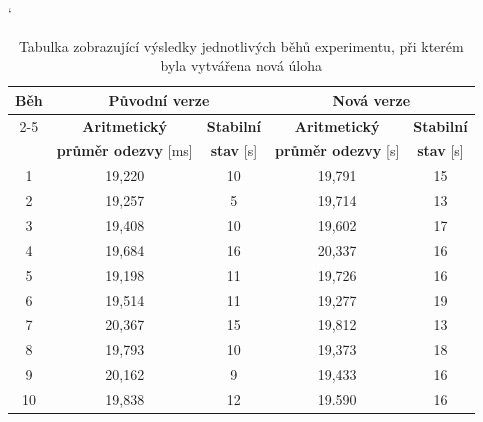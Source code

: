             \begin{table}[ht]
             \catcode`
             \begin{adjustwidth}{-0.5cm}{}
             \begin{center}
              \begin{tabular}{| c || c | c || c | c |} \hline
                \multirow{4}{*}{Běh}  &   \multicolumn{2}{c||}{\textbf{Původní verze}}  &  \multicolumn{2}{c|}{\textbf{Nová verze}}\\ \cline{2-5}
                 & \textbf{Aritmetický} &  \textbf{Stabilní} &  \textbf{Aritmetický}  &  \textbf{Stabilní}\\  
                 & \textbf{průměr odezvy} [ms]  &   \textbf{stav} [s]  &  \textbf{průměr odezvy} [s] &  \textbf{stav} [s]\\\hline
                1 & 19,220 & 10 &  19,791 & 15\\\hline
                2  & 19,257 & 5 & 19,714 & 13\\\hline
                3 & 19,408 & 10 & 19,602 & 17\\\hline
                4 & 19,684  & 16 & 20,337 & 16\\\hline
                5 & 19,198 & 11 & 19,726 & 16\\\hline\hline
                6 & 19,514 & 11 & 19,277 & 19\\\hline
                7 & 20,367 & 15 & 19,812 & 13\\\hline
                8 & 19,793 & 10 & 19,373 & 18\\\hline
                9 & 20,162 & 9 & 19,433 & 16\\\hline
                10 & 19,838 & 12 & 19.590 & 16\\\hline
              \end{tabular}
              \caption{Tabulka zobrazující výsledky jednotlivých běhů experimentu, při kterém byla vytvářena nová úloha}
              \label{tabCreateFreestyleMain}
             \end{center}
            \end{adjustwidth}
            \end{table}
		
		

